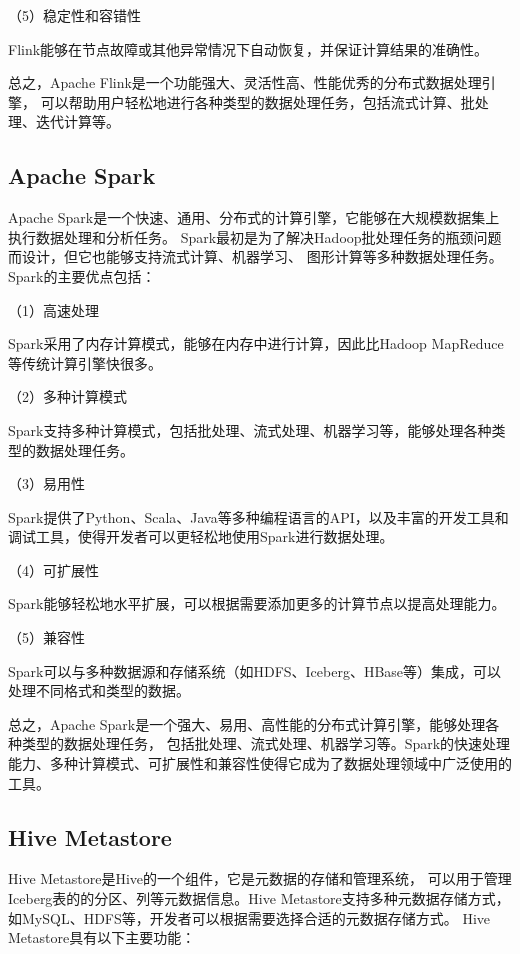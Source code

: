 （5）稳定性和容错性

Flink能够在节点故障或其他异常情况下自动恢复，并保证计算结果的准确性。

总之，Apache Flink是一个功能强大、灵活性高、性能优秀的分布式数据处理引擎，
可以帮助用户轻松地进行各种类型的数据处理任务，包括流式计算、批处理、迭代计算等。

\subsection{Apache Spark}

Apache Spark是一个快速、通用、分布式的计算引擎，它能够在大规模数据集上执行数据处理和分析任务。
Spark最初是为了解决Hadoop批处理任务的瓶颈问题而设计，但它也能够支持流式计算、机器学习、
图形计算等多种数据处理任务\cite{23}。Spark的主要优点包括：

（1）高速处理

Spark采用了内存计算模式，能够在内存中进行计算，因此比Hadoop MapReduce等传统计算引擎快很多。

（2）多种计算模式

Spark支持多种计算模式，包括批处理、流式处理、机器学习等，能够处理各种类型的数据处理任务。

（3）易用性

Spark提供了Python、Scala、Java等多种编程语言的API，以及丰富的开发工具和调试工具，使得开发者可以更轻松地使用Spark进行数据处理。

（4）可扩展性

Spark能够轻松地水平扩展，可以根据需要添加更多的计算节点以提高处理能力。

（5）兼容性

Spark可以与多种数据源和存储系统（如HDFS、Iceberg、HBase等）集成，可以处理不同格式和类型的数据。

总之，Apache Spark是一个强大、易用、高性能的分布式计算引擎，能够处理各种类型的数据处理任务，
包括批处理、流式处理、机器学习等。Spark的快速处理能力、多种计算模式、可扩展性和兼容性使得它成为了数据处理领域中广泛使用的工具。

\subsection{Hive Metastore}

Hive Metastore是Hive的一个组件，它是元数据的存储和管理系统，
可以用于管理Iceberg表的的分区、列等元数据信息。Hive Metastore支持多种元数据存储方式，
如MySQL、HDFS等，开发者可以根据需要选择合适的元数据存储方式\cite{30}。
Hive Metastore具有以下主要功能：

